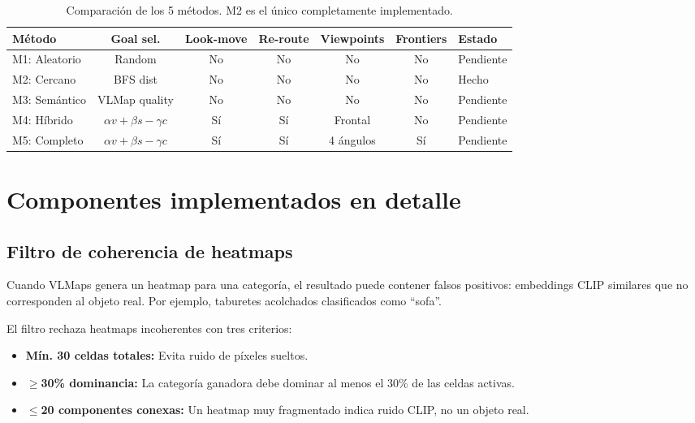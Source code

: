 \documentclass[11pt,a4paper]{article}
\begin{document}
\begin{table}[h]
\centering
\small
\begin{tabular}{lcccccl}
\toprule
\textbf{Método} & \textbf{Goal sel.} & \textbf{Look-move} & \textbf{Re-route} & \textbf{Viewpoints} & \textbf{Frontiers} & \textbf{Estado} \\
\midrule
M1: Aleatorio & Random & No & No & No & No & Pendiente \\
M2: Cercano & BFS dist & No & No & No & No & \textcolor{done}{Hecho} \\
M3: Semántico & VLMap quality & No & No & No & No & Pendiente \\
M4: Híbrido & $\alpha v + \beta s - \gamma c$ & Sí & Sí & Frontal & No & Pendiente \\
M5: Completo & $\alpha v + \beta s - \gamma c$ & Sí & Sí & 4 ángulos & Sí & Pendiente \\
\bottomrule
\end{tabular}
\caption{Comparación de los 5 métodos. M2 es el único completamente implementado.}
\end{table}

\section{Componentes implementados en detalle}

\subsection{Filtro de coherencia de heatmaps}

Cuando VLMaps genera un heatmap para una categoría, el resultado puede contener falsos positivos: embeddings CLIP similares que no corresponden al objeto real. Por ejemplo, taburetes acolchados clasificados como ``sofa''.

El filtro rechaza heatmaps incoherentes con tres criterios:
\begin{itemize}
    \item \textbf{Mín. 30 celdas totales:} Evita ruido de píxeles sueltos.
    \item \textbf{$\geq$30\% dominancia:} La categoría ganadora debe dominar al menos el 30\% de las celdas activas.
    \item \textbf{$\leq$20 componentes conexas:} Un heatmap muy fragmentado indica ruido CLIP, no un objeto real.
\end{itemize}
\end{document}
